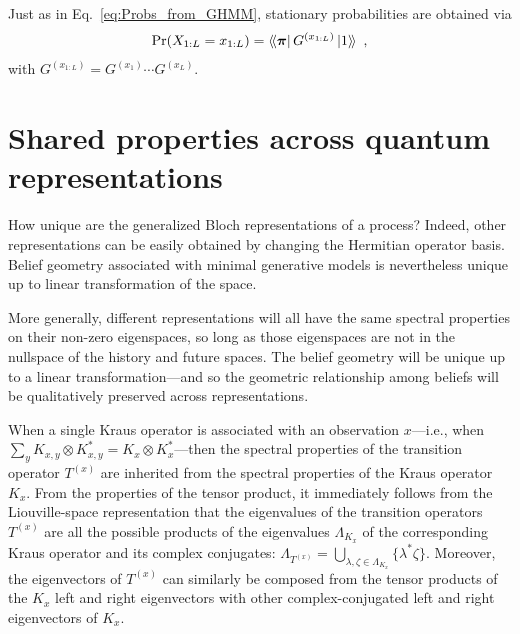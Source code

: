 \documentclass[prx,nofootinbib,onecolumn,showkeys,groupaddress,preprintnumbers,floatfix,
superscriptaddress]{revtex4-1}
\newcommand{\stationary}{\boldsymbol{\pi}}
\newcommand{\dbra}[1]{\bra{ \! \langle #1}}
\newcommand{\dket}[1]{\ket{ #1 \rangle \!}}
\begin{document}
Just as in Eq.~\eqref{eq:Probs_from_GHMM},
stationary probabilities are obtained via
\begin{align}
	\Pr(X_{1:L} = x_{1:L}) = \dbra{\stationary} G^{(x_{1:L})} \dket{1} ~,
\end{align}	
with 
$G^{(x_{1:L})} = G^{(x_{1})} \cdots G^{(x_{L})} $.


\section{Shared properties across quantum representations}


How unique are the generalized Bloch representations of a process?
Indeed, other representations can be easily obtained by changing the Hermitian operator basis.
%
Belief geometry associated with minimal generative models is nevertheless unique up to linear transformation of the space.

More generally, different representations will all have the same spectral properties on their non-zero eigenspaces, so long as those eigenspaces are not in the nullspace of the history and future spaces.
%
The belief geometry will be unique up to a linear transformation---and so the geometric relationship among beliefs will be qualitatively preserved across representations.

When a single Kraus operator is associated with an observation $x$---i.e., when $\sum_y K_{x,y} \otimes K_{x,y}^* = K_x \otimes K_x^*$---then the spectral properties of the transition operator $T^{(x)}$ are inherited from the spectral properties of the Kraus operator $K_x$.
From the properties of the tensor product, it immediately follows from the Liouville-space representation that the eigenvalues of the 
transition operators $T^{(x)}$ are all the possible products of the eigenvalues $\Lambda_{K_x}$ of the corresponding Kraus operator and its complex conjugates: $\Lambda_{T^{(x)}} = \bigcup_{\lambda , \zeta \in \Lambda_{K_x}} \{ \lambda^* \zeta \}$.
Moreover, the eigenvectors of $T^{(x)}$ can similarly be composed from the tensor products of the $K_x$ left and right eigenvectors with other complex-conjugated left and right eigenvectors of $K_x$.



\end{document}

